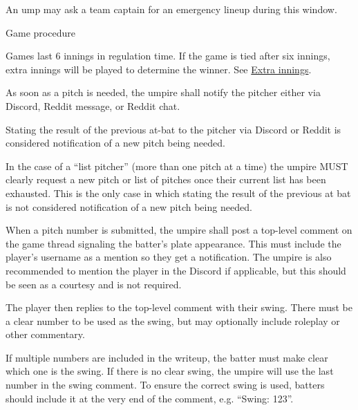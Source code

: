 \begin{deepEnumerate}
\begin{deepEnumerate}
\begin{deepEnumerate}
\begin{deepEnumerate}
				\begin{deepEnumerate}
					\item An ump may ask a team captain for an emergency lineup during this window.
				\end{deepEnumerate}
			\end{deepEnumerate}
		\end{deepEnumerate}
	\end{deepEnumerate}
	\item Game procedure
	\begin{deepEnumerate}
		\item Games last 6 innings in regulation time. If the game is tied after six innings, extra innings will be played to determine the winner. 
		See \hyperref[sec:extra innings]{Extra innings}.
		\item As soon as a pitch is needed, the umpire shall notify the pitcher either via Discord, Reddit message, or Reddit chat.
		\begin{deepEnumerate}
			\item Stating the result of the previous at-bat to the pitcher via Discord or Reddit is considered notification of a new pitch being needed.
			\item In the case of a “list pitcher” (more than one pitch at a time) the umpire MUST clearly request a new pitch or list
			 of pitches once their current list has been exhausted. This is the only case in which stating the result of the previous
			 at bat is not considered notification of a new pitch being needed.
		\end{deepEnumerate}
		\item When a pitch number is submitted, the umpire shall post a top-level comment on the game thread signaling the batter's plate appearance. 
		This must include the player's username as a mention so they get a notification. The umpire is also recommended to mention the player in the Discord if applicable, 
		but this should be seen as a courtesy and is not required.
		\item The player then replies to the top-level comment with their swing. There must be a clear number to be used as the swing, 
		but may optionally include roleplay or other commentary.
		\begin{deepEnumerate}
			\item If multiple numbers are included in the writeup, the batter must make clear which one is the swing. If there is no clear swing, the umpire will use 
			the last number in the swing comment. To ensure the correct swing is used, batters should include it at the very end of the comment, e.g. “Swing: 123”.

\end{deepEnumerate}
\end{deepEnumerate}
\end{deepEnumerate}
